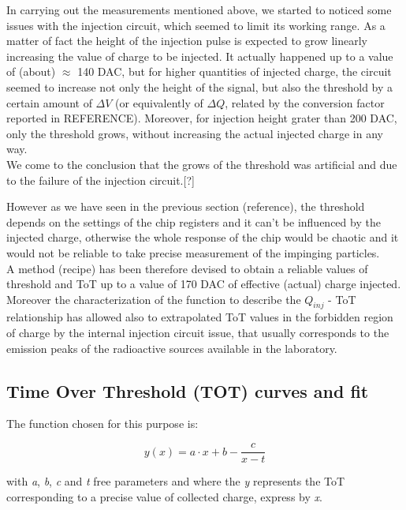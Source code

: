 In carrying out the measurements mentioned above, we started to noticed some issues with the injection circuit, which seemed to limit its working range. As a matter of fact the height of the injection pulse is expected to grow linearly increasing the value of charge to be injected.
It actually happened up to a value of (about) $\approx$ 140 DAC, but for higher quantities of injected charge, the circuit seemed to increase not only the height of the signal, but also the threshold by a certain amount of $\Delta V$ (or equivalently of $\Delta Q$, related by the conversion factor reported in REFERENCE). Moreover, for injection height grater than 200 DAC, only the threshold grows, without increasing the actual injected charge in any way.\\
We come to the conclusion that the grows of the threshold was artificial and due to the failure of the injection circuit.[?]

However as we have seen in the previous section (reference), the threshold depends on the settings of the chip registers and it can't be influenced by the injected charge, otherwise the whole response of the chip would be chaotic and it would not be reliable to take precise measurement of the impinging particles. \\

A method (recipe) has been therefore devised to obtain a reliable values of threshold and ToT up to a value of 170 DAC of effective (actual) charge injected. Moreover the characterization of the function to describe the $Q_{inj}$ - ToT relationship has allowed also to extrapolated ToT values in the forbidden region of charge by the internal injection circuit issue, that usually corresponds to the emission peaks of the radioactive sources available in the laboratory.


\subsection{Time Over Threshold (TOT) curves and fit} \label{tot_fit}

The function chosen for this purpose is:

\begin{equation}
y(x) = a\cdot x +b -\frac{c}{x-t}
\end{equation}

with \textit{a}, \textit{b}, \textit{c} and \textit{t} free parameters and where the \textit{y} represents the ToT corresponding to a precise value of collected charge, express by \textit{x}. 

